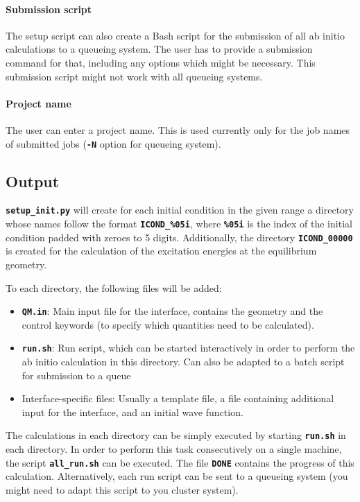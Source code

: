 \documentclass[a4paper,10pt,DIV=15,openany,twoside=false]{scrbook}
\newcommand{\ttt}[1]{\textbf{\texttt{#1}}}
\begin{document}
\paragraph{Submission script}

The setup script can also create a Bash script for the submission of all ab initio calculations to a queueing system. The user has to provide a submission command for that, including any options which might be necessary. This submission script might not work with all queueing systems.

\paragraph{Project name}

The user can enter a project name. This is used currently only for the job names of submitted jobs (\ttt{-N} option for queueing system).

\subsection{Output}

\ttt{setup\_init.py} will create for each initial condition in the given range a directory whose names follow the format \ttt{ICOND\_\%05i}, where \ttt{\%05i} is the index of the initial condition padded with zeroes to 5 digits. Additionally, the directory \ttt{ICOND\_00000} is created for the calculation of the excitation energies at the equilibrium geometry.

To each directory, the following files will be added:
\begin{itemize}
  \item \ttt{QM.in}: Main input file for the interface, contains the geometry and the control keywords (to specify which quantities need to be calculated). 
  \item \ttt{run.sh}: Run script, which can be started interactively in order to perform the ab initio calculation in this directory. Can also be adapted to a batch script for submission to a queue 
  \item Interface-specific files: Usually a template file, a file containing additional input for the interface, and an initial wave function.
\end{itemize}

The calculations in each directory can be simply executed by starting \ttt{run.sh} in each directory. In order to perform this task consecutively on a single machine, the script \ttt{all\_run.sh} can be executed. The file \ttt{DONE} contains the progress of this calculation.
Alternatively, each run script can be sent to a queueing system (you might need to adapt this script to you cluster system).
\end{document}
